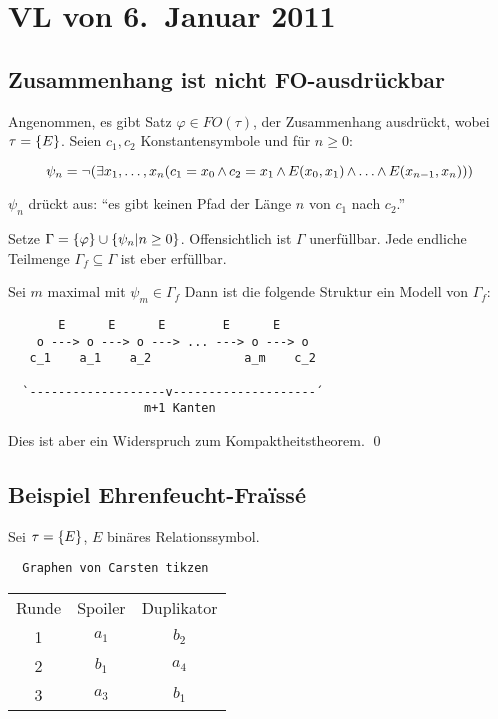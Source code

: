 \section{VL von 6.~Januar 2011}

\subsection{Zusammenhang ist nicht FO-ausdrückbar}

Angenommen, es gibt Satz $\varphi\in FO(\tau)$, der Zusammenhang ausdrückt,
wobei $\tau=\left\{E\right\}$. Seien $c_1,c_2$ Konstantensymbole und für $n\geq 0$:

\[
  \psi_n = \operatorname{\neg}(\exists x_1,\dots,x_n (c_1=x_0 \operatorname{\wedge} c_2=x_1 \operatorname{\wedge} E(x_0,x_1) \operatorname{\wedge} \dots \operatorname{\wedge} E(x_{n-1},x_n)))
\]

$\psi_n$ drückt aus: \enquote{es gibt keinen Pfad der Länge $n$ von $c_1$ nach $c_2$.}

Setze $\Gamma=\left\{\varphi\right\}\cup\left\{\psi_n|n\geq 0\right\}$. Offensichtlich ist
$\Gamma$ unerfüllbar. Jede endliche Teilmenge $\Gamma_f\subseteq\Gamma$ ist
eber erfüllbar.

Sei $m$ maximal mit $\psi_m\in\Gamma_f$ Dann ist die folgende Struktur
ein Modell von $\Gamma_f$:

\begin{verbatim}
       E      E      E        E      E
    o ---> o ---> o ---> ... ---> o ---> o
   c_1    a_1    a_2             a_m    c_2
   
  `-------------------v--------------------´
                   m+1 Kanten
\end{verbatim}

Dies ist aber ein Widerspruch zum Kompaktheitstheorem.
\qed

\subsection{Beispiel Ehrenfeucht-Fraïssé}

Sei $\tau=\left\{E\right\}$, $E$ binäres Relationssymbol.

\begin{verbatim}
  Graphen von Carsten tikzen
\end{verbatim}

\begin{tabular}{ccc}
  Runde & Spoiler & Duplikator \\
  1 & $a_1$ & $b_2$ \\
  2 & $b_1$ & $a_4$ \\
  3 & $a_3$ & $b_1$ \\
\end{tabular}

